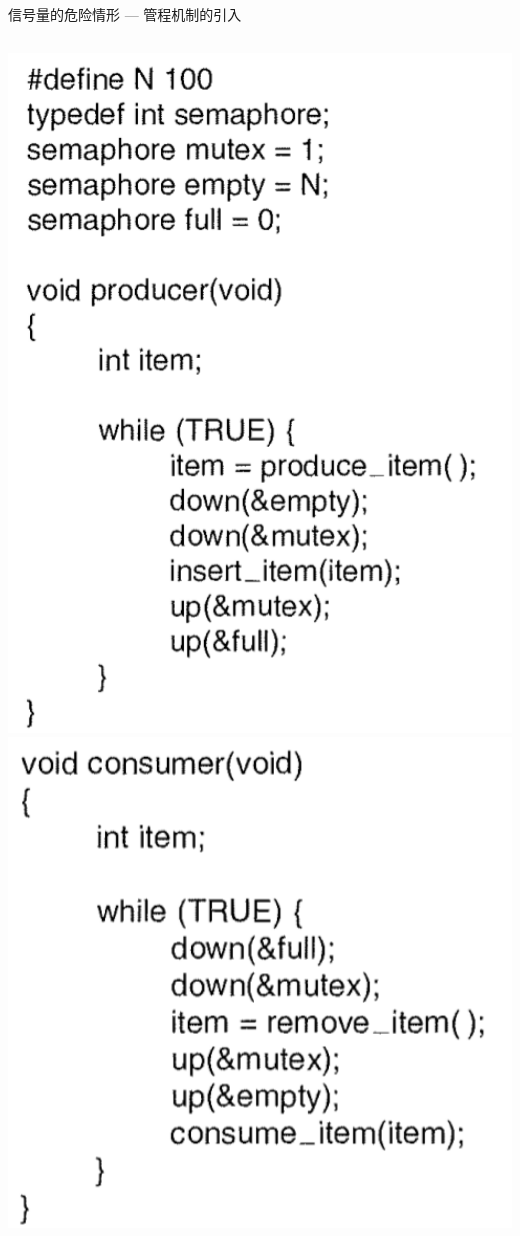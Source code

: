 \documentclass[xcolor=svgnames]{beamer}
\begin{document}
\begin{CJK*}{UTF8}{gbsn}
\begin{frame}{信号量的危险情形 --- 管程机制的引入}
\begin{columns}[b]
\includegraphics[width=1.0\textwidth]{prodsem.png}
\includegraphics[width=1.0\textwidth]{conssem.png}
\end{columns}%


\end{frame}
\end{CJK*}
\end{document}
